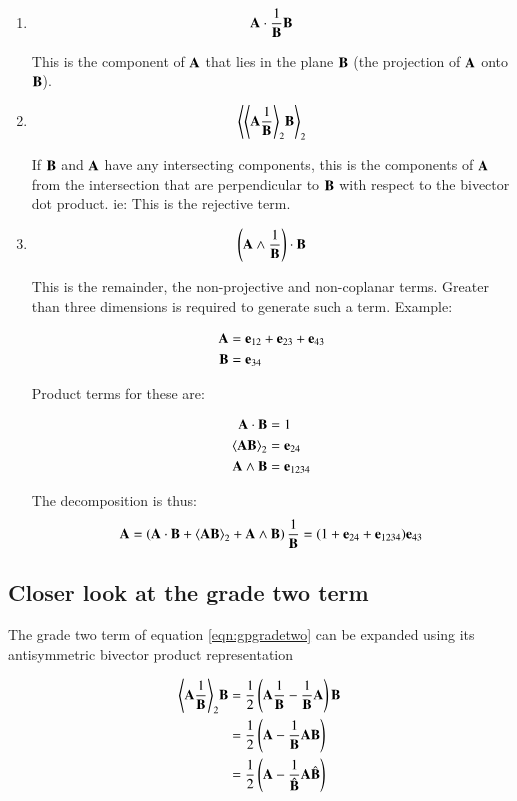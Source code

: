 \documentclass{article}      %
\newcommand{\gpgrade}[2] {{\left\langle{{#1}}\right\rangle}_{#2}}
\newcommand{\gpgradetwo}[1] {\gpgrade{#1}{2}}
\begin{document}
\begin{enumerate}
\item \[ \mathbf{A} \cdot \frac{1}{\mathbf{B}} \mathbf{B} \]

This is the component of $\mathbf{A}$ that lies in the plane $\mathbf{B}$ (the projection
of $\mathbf{A}$ onto $\mathbf{B}$).

\item
\begin{equation}\label{eqn:gpgradetwo}
\gpgradetwo{\gpgradetwo{\BA\inv\BB} \BB}
\end{equation}

If $\mathbf{B}$ and $\mathbf{A}$ have any intersecting components, this is the components
of $\mathbf{A}$ from the intersection that are perpendicular to $\mathbf{B}$ with respect to the bivector dot product.  ie: This is the rejective term.

\item \[ \left(\mathbf{A} \wedge \frac{1}{\mathbf{B}}\right) \cdot \mathbf{B} \]

This is the remainder, the non-projective and non-coplanar terms.  
Greater than three dimensions is required to generate such a term.  Example:

\begin{align*}
\mathbf{A} &= \mathbf{e}_{12} + \mathbf{e}_{23} + \mathbf{e}_{43} \\
\mathbf{B} &= \mathbf{e}_{34} \\
\end{align*}

Product terms for these are:

\begin{align*}
\BA \cdot \BB &= 1 \\
\gpgradetwo{\BA \BB} &= \Be_{24} \\
\BA \wedge \BB &= \Be_{1234} \\
\end{align*}

The decomposition is thus:
\[
\BA = \left(\BA \cdot \BB + \gpgradetwo{\BA \BB} + \BA \wedge \BB\right) \inv{\BB} = (1 + \Be_{24} + \Be_{1234}) \Be_{43}
\]

\end{enumerate}

\subsection{ Closer look at the grade two term }

The grade two term of equation \ref{eqn:gpgradetwo} can be expanded using its antisymmetric bivector product representation

\begin{align*}
\gpgradetwo{\BA\inv\BB} \BB
&= \inv{2}\left(\BA\inv{\BB} - \inv{\BB}\BA\right) \BB \\
&= \inv{2}\left(\BA - \inv{\BB}\BA \BB\right) \\
&= \inv{2}\left(\BA - \inv{\hat{\BB}}\BA \hat{\BB}\right) \\
\end{align*}
\end{document}
